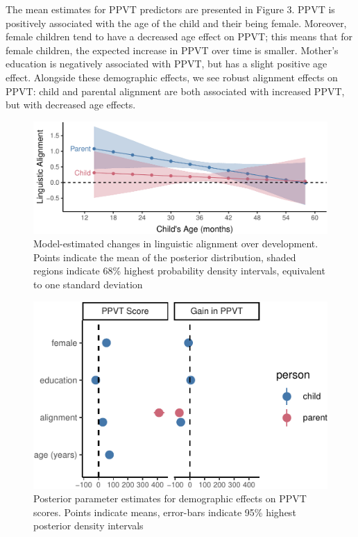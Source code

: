 \documentclass[10pt, letterpaper]{article}
\newenvironment{CodeChunk}{}{}
\begin{document}
The mean estimates for PPVT predictors are presented in Figure 3. PPVT
is positively associated with the age of the child and their being
female. Moreover, female children tend to have a decreased age effect on
PPVT; this means that for female children, the expected increase in PPVT
over time is smaller. Mother's education is negatively associated with
PPVT, but has a slight positive age effect. Alongside these demographic
effects, we see robust alignment effects on PPVT: child and parental
alignment are both associated with increased PPVT, but with decreased
age effects.

\begin{CodeChunk}
\begin{figure}[tb]

{\centering \includegraphics{figs/hpds-1} 

}

\caption[Model-estimated changes in linguistic alignment over development]{Model-estimated changes in linguistic alignment over development. Points indicate the mean of the posterior distribution, shaded regions indicate 68\% highest probability density intervals, equivalent to one standard deviation}\label{fig:hpds}
\end{figure}
\end{CodeChunk}

\begin{CodeChunk}
\begin{figure}[tb]
\includegraphics{figs/demopar_plot-1} \caption[Posterior parameter estimates for demographic effects on PPVT scores]{Posterior parameter estimates for demographic effects on PPVT scores. Points indicate means, error-bars indicate 95\% highest posterior density intervals}\label{fig:demopar_plot}
\end{figure}
\end{CodeChunk}
\end{document}

